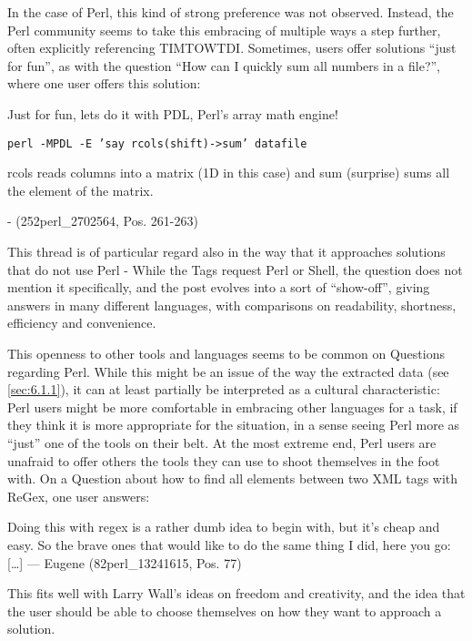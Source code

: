 In the case of Perl, this kind of strong preference was not observed. Instead, the Perl community seems to take this
embracing of multiple ways a step further, often explicitly referencing TIMTOWTDI. Sometimes, users offer solutions
“just for fun”, as with the question “How can I quickly sum all numbers in a file?”, where one user offers this solution:

\begin{displayquote}
    Just for fun, lets do it with PDL, Perl's array math engine!

    \texttt{perl -MPDL -E 'say rcols(shift)->sum' datafile}

    rcols reads columns into a matrix (1D in this case) and sum (surprise) sums all the element of the matrix.

    - (252perl\_2702564, Pos. 261-263)
\end{displayquote}

This thread is of particular regard also in the way that it approaches solutions that do not use Perl - While the Tags
request Perl or Shell, the question does not mention it specifically, and the post evolves into a sort of “show-off”,
giving answers in many different languages, with comparisons on readability, shortness, efficiency and convenience.

This openness to other tools and languages seems to be common on Questions regarding Perl. While this might be an issue
of the way the extracted data (see \ref{sec:6.1.1}), it can at least partially be interpreted as a cultural characteristic:
Perl users might be more comfortable in embracing other languages for a task, if they think it is more appropriate for
the situation, in a sense seeing Perl more as “just” one of the tools on their belt.
At the most extreme end, Perl users are unafraid to offer others the tools they can use to shoot themselves in the foot with.
On a Question about how to find all elements between two XML tags with ReGex, one user answers:

\begin{displayquote}
    [\ldots] Doing this with regex is a rather dumb idea to begin with, but it's cheap and easy. So the brave ones that
     would like to do the same thing I did, here you go: [\ldots]
    --- Eugene (82perl\_13241615, Pos. 77)
\end{displayquote}

This fits well with Larry Wall's ideas on freedom and creativity, and the idea that the user should be able to choose
themselves on how they want to approach a solution.

